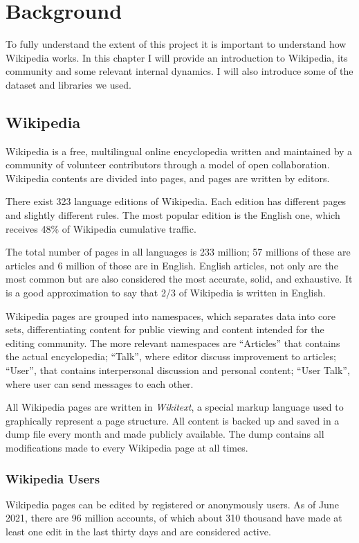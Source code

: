 \chapter{Background}
\label{cha:background}
To fully understand the extent of this project it is important to understand how Wikipedia works. In this chapter I will provide an introduction to Wikipedia, its community and some relevant internal dynamics. I will also introduce some of the dataset and libraries we used.


\section{Wikipedia}
\label{sec:wikipedia}
Wikipedia is a free, multilingual online encyclopedia written and maintained by a community of volunteer contributors through a model of open collaboration. Wikipedia contents are divided into pages, and pages are written by editors.


There exist 323 language editions of Wikipedia. Each edition has different pages and slightly different rules. The most popular edition is the English one, which receives 48\% of Wikipedia cumulative traffic.


The total number of pages in all languages is 233 million; 57 millions of these are articles and 6 million of those are in English. English articles, not only are the most common but are also considered the most accurate, solid, and exhaustive. It is a good approximation to say that 2/3 of Wikipedia is written in English.


Wikipedia pages are grouped into namespaces, which separates data into core sets, differentiating content for public viewing and content intended for the editing community. The more relevant namespaces are “Articles” that contains the actual encyclopedia; “Talk”, where editor discuss improvement to articles; “User”, that contains interpersonal discussion and personal content; “User Talk”, where user can send messages to each other.


All Wikipedia pages are written in \textit{Wikitext}, a special markup language used to graphically represent a page structure. All content is backed up and saved in a dump file every month and made publicly available. The dump contains all modifications made to every Wikipedia page at all times.



\subsection{Wikipedia Users}
\label{sec:wikipediausers}
Wikipedia pages can be edited by registered or anonymously users. As of June 2021, there are 96 million accounts, of which about 310 thousand have made at least one edit in the last thirty days and are considered active.


